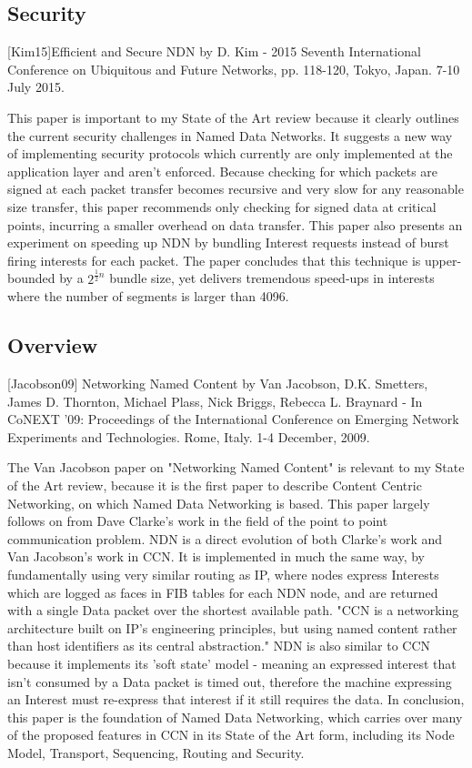 \subsection{Security}
[Kim15]Efficient and Secure NDN by D. Kim - 2015 Seventh International Conference on Ubiquitous and Future Networks, pp. 118-120, Tokyo, Japan. 7-10 July 2015.

This paper is important to my State of the Art review because it clearly outlines the current security challenges in Named Data Networks. It suggests a new way of implementing security protocols which currently are only implemented at the application layer and aren’t enforced. Because checking for which packets are signed at each packet transfer becomes recursive and very slow for any reasonable size transfer, this paper recommends only checking for signed data at critical points, incurring a smaller overhead on data transfer. This paper also presents an experiment on speeding up NDN by bundling Interest requests instead of burst firing interests for each packet. The paper concludes that this technique is upper-bounded by a $2^{\frac{1}{2}n}$ bundle size, yet delivers tremendous speed-ups in interests where the number of segments is larger than 4096.

\subsection{Overview}
[Jacobson09] Networking Named Content by Van Jacobson, D.K. Smetters, James D. Thornton, Michael Plass, Nick Briggs, Rebecca L. Braynard - In CoNEXT '09: Proceedings of the  International Conference on Emerging Network Experiments and Technologies. Rome, Italy. 1-4 December, 2009.

The Van Jacobson paper on "Networking Named Content" is relevant to my State of the Art review, because it is the first paper to describe Content Centric Networking, on which Named Data Networking is based. This paper largely follows on from Dave Clarke's work in the field of the point to point communication problem. NDN is a direct evolution of both Clarke's work and Van Jacobson's work in CCN. It is implemented in much the same way, by fundamentally using very similar routing as IP, where nodes express Interests which are logged as faces in FIB tables for each NDN node, and are returned with a single Data packet over the shortest available path. "CCN is a networking architecture built on IP's engineering principles, but using named content rather than host identifiers as its central abstraction." NDN is also similar to CCN because it implements its 'soft state' model - meaning an expressed interest that isn't consumed by  a Data packet is timed out, therefore the machine expressing an Interest must re-express that interest if it still requires the data. In conclusion, this paper is the foundation of Named Data Networking, which carries over many of the proposed features in CCN in its State of the Art form, including its Node Model, Transport, Sequencing, Routing and Security.


